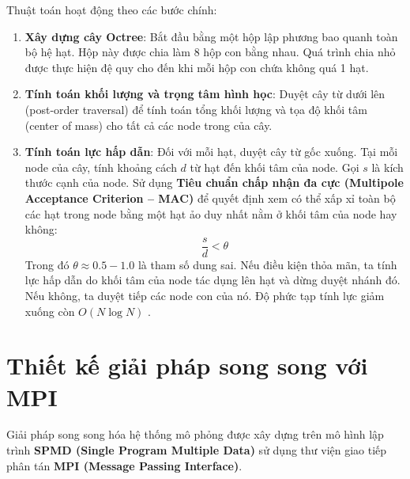 \documentclass[12pt]{article}
\begin{document}
Thuật toán hoạt động theo các bước chính:
\begin{enumerate}
    \item \textbf{Xây dựng cây Octree}: Bắt đầu bằng một hộp lập phương bao quanh toàn bộ hệ hạt. Hộp này được chia làm 8 hộp con bằng nhau. Quá trình chia nhỏ được thực hiện đệ quy cho đến khi mỗi hộp con chứa không quá 1 hạt.
    \item \textbf{Tính toán khối lượng và trọng tâm hình học}: Duyệt cây từ dưới lên (post-order traversal) để tính toán tổng khối lượng và tọa độ khối tâm (center of mass) cho tất cả các node trong của cây.
    \item \textbf{Tính toán lực hấp dẫn}: Đối với mỗi hạt, duyệt cây từ gốc xuống. Tại mỗi node của cây, tính khoảng cách $d$ từ hạt đến khối tâm của node. Gọi $s$ là kích thước cạnh của node. Sử dụng \textbf{Tiêu chuẩn chấp nhận đa cực (Multipole Acceptance Criterion -- MAC)} để quyết định xem có thể xấp xỉ toàn bộ các hạt trong node bằng một hạt ảo duy nhất nằm ở khối tâm của node hay không:
    \begin{equation}
    \frac{s}{d} < \theta
    \end{equation}
    Trong đó $\theta \approx 0.5 - 1.0$ là tham số dung sai. Nếu điều kiện thỏa mãn, ta tính lực hấp dẫn do khối tâm của node tác dụng lên hạt và dừng duyệt nhánh đó. Nếu không, ta duyệt tiếp các node con của nó. Độ phức tạp tính lực giảm xuống còn $O(N \log N)$ \cite{brandt2022, rein2011}.
\end{enumerate}

\section{Thiết kế giải pháp song song với MPI}
\label{sec:parallel}

Giải pháp song song hóa hệ thống mô phỏng được xây dựng trên mô hình lập trình \textbf{SPMD (Single Program Multiple Data)} sử dụng thư viện giao tiếp phân tán \textbf{MPI (Message Passing Interface)}.
\end{document}
